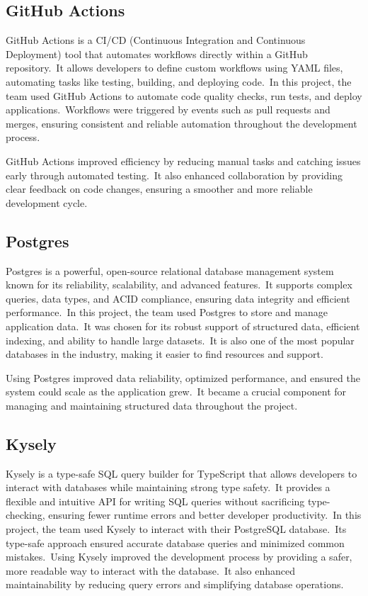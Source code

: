 \subsection{GitHub Actions}\label{subsec:github-actions}

GitHub Actions is a CI/CD (Continuous Integration and Continuous Deployment) tool that automates workflows directly within a GitHub repository.\ It allows developers to define custom workflows using YAML files, automating tasks like testing, building, and deploying code.\ In this project, the team used GitHub Actions to automate code quality checks, run tests, and deploy applications.\ Workflows were triggered by events such as pull requests and merges, ensuring consistent and reliable automation throughout the development process.\cite[GitHub Actions]{githubActions}

GitHub Actions improved efficiency by reducing manual tasks and catching issues early through automated testing.\ It also enhanced collaboration by providing clear feedback on code changes, ensuring a smoother and more reliable development cycle.

\subsection{Postgres}\label{subsec:postgres}

Postgres is a powerful, open-source relational database management system known for its reliability, scalability, and advanced features.\ It supports complex queries, data types, and ACID compliance, ensuring data integrity and efficient performance.\ In this project, the team used Postgres to store and manage application data.\ It was chosen for its robust support of structured data, efficient indexing, and ability to handle large datasets.\ It is also one of the most popular databases in the industry, making it easier to find resources and support.\cite[Postgres]{postgres}

Using Postgres improved data reliability, optimized performance, and ensured the system could scale as the application grew.\ It became a crucial component for managing and maintaining structured data throughout the project.

\subsection{Kysely}\label{subsec:kysely}

Kysely is a type-safe SQL query builder for TypeScript that allows developers to interact with databases while maintaining strong type safety.\ It provides a flexible and intuitive API for writing SQL queries without sacrificing type-checking, ensuring fewer runtime errors and better developer productivity.\ In this project, the team used Kysely to interact with their PostgreSQL database.\ Its type-safe approach ensured accurate database queries and minimized common mistakes.\ Using Kysely improved the development process by providing a safer, more readable way to interact with the database.\ It also enhanced maintainability by reducing query errors and simplifying database operations.\cite[Kysely]{kysely}

